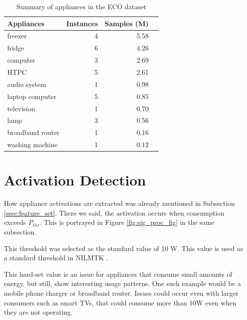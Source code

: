 \begin{table}[H]
    \centering
    \begin{tabular}{lrrr}
        \toprule
        \textbf{Appliances} & \textbf{Instances} & \textbf{Samples (M)}  \\
        \midrule
        freezer             & 4                   & 5.58                 \\
        fridge              & 6                   & 4.26                 \\
        computer            & 3                   & 2.69                 \\
        HTPC                & 5                   & 2.61                 \\
        audio system        & 1                   & 0.98                 \\
        laptop computer     & 5                   & 0.85                 \\
        television          & 1                   & 0.70                 \\
        lamp                & 3                   & 0.56                 \\
        broadband router    & 1                   & 0.16                 \\
        washing machine     & 1                   & 0.12                 \\
        \bottomrule
    \end{tabular}
    \caption{Summary of appliances in the ECO dataset}
    \label{tab:eco_table}
\end{table}


\section{Activation Detection}

How appliance activations are extracted was already mentioned in Subsection \ref{ssec:feature_set}.
There we said, the activation occurs when consumption exceeds $P_{thr}$.
This is portrayed in Figure \ref{fig:sig_proc_fig} in the same subsection.

This threshold was selected as the standard value of 10 W.
This value is used as a standard threshold in NILMTK \cite{nilmtk}.

This hard-set value is an issue for appliances that consume small amounts of energy,
but still, show interesting usage patterns.
One such example would be a mobile phone charger or broadband router.
Issues could occur even with larger consumers such as smart TVs, that could consume more than 10W even when they are not operating.

